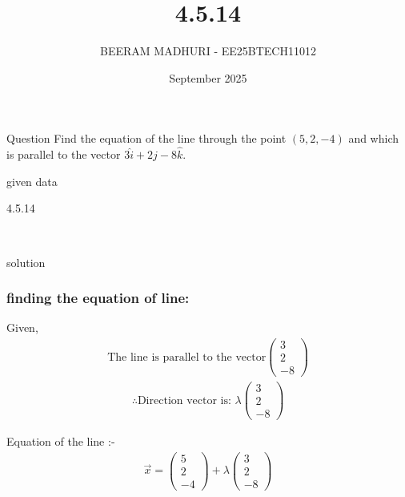 \documentclass{beamer}
\title %
{4.5.14}
\date{September  2025}
\author %
{BEERAM MADHURI - EE25BTECH11012}
\begin{document}
\frame{\titlepage}
\begin{frame}{Question}
 Find the equation of the line through the point $(5, 2, -4)$ and which is parallel to the vector $3\hat{i} + 2\hat{j} - 8\hat{k}$.
\end{frame}
 
\begin{frame}{given data}
 
\begin{table}[h!]
    \centering
    
    \caption{4.5.14}
    \label{table 4.5.14}
\end{table}\\
   
\end{frame}

\begin{frame}{solution}
    \frametitle{finding the equation of line: }
Given,
\begin{align}
\text{The line is parallel to the vector}
\begin{pmatrix}3 \\2 \\-8\end{pmatrix}
\end{align}
\begin{align}
\therefore \text{Direction vector is: } \lambda\begin{pmatrix}
3 \\
2 \\
-8
\end{pmatrix}
\end{align}

Equation of the line :-
\begin{align}
\vec{x} = \begin{pmatrix}5 \\2 \\-4\end{pmatrix} + \lambda \begin{pmatrix}3 \\2 \\-8\end{pmatrix}
\end{align}
\end{frame}
\end{document}
